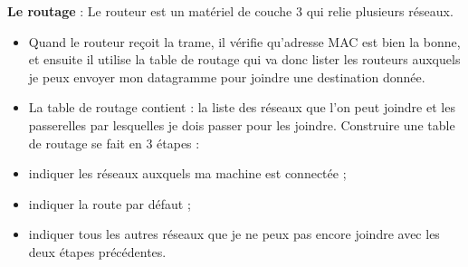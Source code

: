 \documentclass[a4paper,9pt, twocolumn]{article}
\begin{document}
	\textbf{Le routage} : Le routeur est un matériel de couche 3 qui relie plusieurs réseaux.
	\begin{itemize}
		\item Quand le routeur reçoit la trame, il vérifie qu'adresse MAC est bien la bonne, et ensuite il utilise la table de routage qui va donc lister les routeurs auxquels je peux envoyer mon datagramme pour joindre une destination donnée.
		\item La table de routage contient : la liste des réseaux que l'on peut joindre et les passerelles par lesquelles je dois passer pour les joindre. Construire une table de routage se fait en 3 étapes :
		\item indiquer les réseaux auxquels ma machine est connectée ;
		\item indiquer la route par défaut ;
		\item indiquer tous les autres réseaux que je ne peux pas encore joindre avec les deux étapes précédentes.
	\end{itemize}
\end{document}
